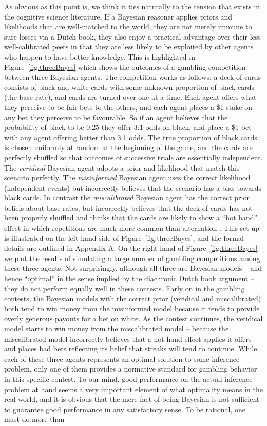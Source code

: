 \documentclass[doc,floatsintext]{apa6}
\begin{document}
As obvious as this point is, we think it ties naturally to the tension that exists in the cognitive science literature. If a Bayesian reasoner applies priors and likelihoods that are well-matched to the world, they are not merely immune to sure losses via a Dutch book, they also enjoy a practical advantage over their less well-calibrated peers in that they are less likely to be exploited by other agents who happen to have better knowledge. This is highlighted in Figure~\ref{fig:threeBayes} which shows the outcomes of a gambling competition between three Bayesian agents. The competition works as follows: a deck of cards consists of black and white cards with some unknown proportion of black cards (the base rate), and cards are turned over one at a time. Each agent offers what they perceive to be fair bets to the others, and each agent places a \$1 stake on any bet they perceive to be favourable. So if an agent believes that the probability of black to be 0.25 they offer 3:1 odds on black, and place a \$1 bet with any agent offering better than 3:1 odds. The true proportion of black cards is chosen uniformly at random at the beginning of the game, and the cards are perfectly shuffled so that outcomes of successive trials are essentially independent. The {\it veridical} Bayesian agent adopts a prior and likelihood that match this scenario perfectly. The {\it misinformed} Bayesian agent uses the correct likelihood (independent events) but incorrectly believes that the scenario has a bias towards black cards. In contrast the {\it miscalibrated} Bayesian agent has the correct prior beliefs about base rates, but incorrectly believes that the deck of cards has not been properly shuffled and thinks that the cards are likely to show a ``hot hand'' effect in which repetitions are much more common than alternation \cite{gilovich_hot_1985}. This set up is illustrated on the left hand side of Figure~\ref{fig:threeBayes}, and the formal details are outlined in Appendix A. On the right hand of Figure~\ref{fig:threeBayes} we plot the results of simulating a large number of gambling competitions among these three agents. Not surprisingly, although all three are Bayesian models -- and hence ``optimal'' in the sense implied by the diachronic Dutch book argument -- they do not perform equally well in these contests. Early on in the gambling contests, the Bayesian models with the correct prior (veridical and miscalibrated) both tend to win money from the misinformed model because it tends to provide overly generous payouts for a bet on white. As the contest continues, the veridical model starts to win money from the miscalibrated model -- because the miscalibrated model incorrectly believes that a hot hand effect applies it offers and places bad bets reflecting its belief that streaks will tend to continue. While each of these three agents represents an optimal solution to some inference problem, only one of them provides a normative standard for gambling behavior in this specific contest. To our mind, good performance on the actual inference problem at hand seems a very important element of what optimality means in the real world, and it is obvious that the mere fact of being Bayesian is not sufficient to guarantee good performance in any satisfactory sense. To be rational, one must do more than 
\end{document}
